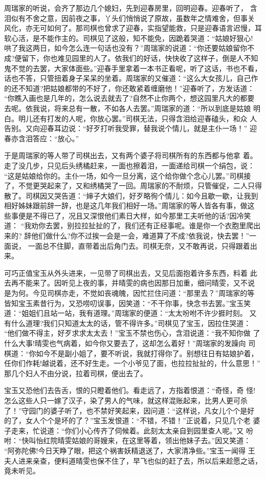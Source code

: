 周瑞家的听说，会齐了那边几个媳妇，先到迎春房里，回明迎春。迎春听了，
含泪似有不舍之意，因前夜之事，丫头们悄悄说了原故，虽数年之情难舍，但事关
风化，亦无可如何了。那司棋也曾求了迎春，实指望能救，只是迎春语言迟慢，耳
软心活，是不能作主的。司棋见了这般，知不能免，因跪着哭道：“姑娘好狠心!
哄了我这两日，如今怎么连一句话也没有？”周瑞家的说道：“你还要姑娘留你不
成?便留下，你也难见园里的人了。依我们的好话，快快收了这样子，倒是人不知
鬼不觉的去罢，大家体面些。”迎春手里拿着一本书正看呢，听了这话，书也不看，
话也不答，只管扭着身子呆呆的坐着。周瑞家的又催道：“这么大女孩儿，自己作
的还不知道?把姑娘都带的不好了，你还敢紧着缠磨他！”迎春听了，方发话道：
“你瞧入画也是几年的，怎么说去就去了?自然不止你两个，想这园里凡大的都要
去呢。依我说，将来总有一散，不如各人去罢。”周瑞家的道：“所以到底是姑娘
明白。明儿还有打发的人呢，你放心罢。”司棋无法，只得含泪给迎春磕头，和众
人告别。又向迎春耳边说：“好歹打听我受罪，替我说个情儿，就是主仆一场！”
迎春亦含泪答应：“放心。”

于是周瑞家的等人带了司棋出去，又有两个婆子将司棋所有的东西都与他拿
着。走了没几步，只见后头绣橘赶来，一面也擦着泪，一面递给司棋一个绢包，说：
“这是姑娘给你的。主仆一场，如今一旦分离，这个给你做个念心儿罢。”司棋接
了，不觉更哭起来了，又和绣橘哭了一回。周瑞家的不耐烦，只管催促，二人只得
散了。司棋因又哭告道：“婶子大娘们，好歹略徇个情儿：如今且歇一歇，让我到
相好姊妹跟前辞一辞，也是这几年我们相好一场。”周瑞家的等人皆各有事，做这
些事便是不得已了，况且又深恨他们素日大样，如今那里工夫听他的话?因冷笑道：
“我劝你去罢，别拉拉扯扯的了，我们还有正经事呢。谁是你一个衣胞里爬出来的?
辞他们做什么?你不过挨一会是一会，难道算了不成?依我说，快去罢！”一面说，
一面总不住脚，直带着出后角门去。司棋无奈，又不敢再说，只得跟着出来。

可巧正值宝玉从外头进来，一见带了司棋出去，又见后面抱着许多东西，料着
此去再不能来了。因听见上夜的事，并晴雯的病也因那日加重，细问晴雯，又不说
是为何。今见司棋亦走，不觉如丧魂魄，因忙拦住问道：“那里去？”周瑞家的等
皆知宝玉素昔行为，又恐唠叨误事，因笑道：“不干你事，快念书去罢。”宝玉笑
道：“姐姐们且站一站，我有道理。”周瑞家的便道：“太太吩咐不许少捱时刻。
又有什么道理?我们只知道太太的话，管不得许多。”司棋见了宝玉，因拉住哭道：
“他们做不得主，好歹求求太太去！”宝玉不禁也伤心，含泪说道：“我不知你做
了什么大事!晴雯也气病着，如今你又要去了，这却怎么着好！”周瑞家的发躁向
司棋道：“你如今不是副小姐了，要不听说，我就打得你了。别想往日有姑娘护着，
任你们作耗!越说着，还不好生走。一个小爷见了面，也拉拉扯扯的，什么意思！”
那几个妇人不由分说，拉着司棋，便出去了。

宝玉又恐他们去告舌，恨的只瞪着他们。看走远了，方指着恨道：“奇怪，奇
怪!怎么这些人只一嫁了汉子，染了男人的气味，就这样混账起来，比男人更可杀
了！”守园门的婆子听了，也不禁好笑起来，因问道：“这样说，凡女儿个个是好
的了，女人个个是坏的了？”宝玉发恨道：“不错，不错！”正说着，只见几个老
婆子走来，忙说道：“你们小心传齐了伺候着。此刻太太亲自到园里查人呢。”又
吩咐：“快叫怡红院晴雯姑娘的哥嫂来，在这里等着，领出他妹子去。”因又笑道：
“阿弥陀佛!今日天睁了眼，把这个祸害妖精退送了，大家清净些。”宝玉一闻得
王夫人进来亲查，便料道晴雯也保不住了，早飞也似的赶了去，所以后来趁愿之话，
竟未听见。

